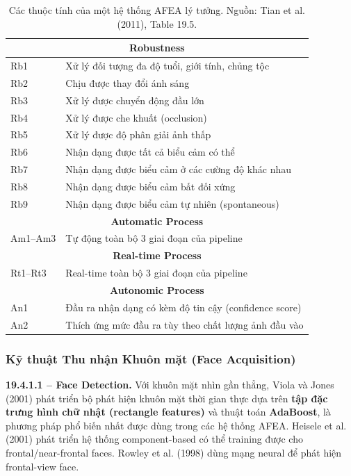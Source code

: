 \documentclass[12pt,a4paper]{article}
\let\oldtextbf\textbf
\renewcommand{\textbf}[1]{\oldtextbf{\textcolor{hcmublue}{#1}}}
\begin{document}
\begin{table}[H]
\centering
\small
\begin{tabular}{|l|l|}
\hline
\multicolumn{2}{|c|}{\textbf{Robustness}} \\ \hline
Rb1 & Xử lý đối tượng đa độ tuổi, giới tính, chủng tộc \\ \hline
Rb2 & Chịu được thay đổi ánh sáng \\ \hline
Rb3 & Xử lý được chuyển động đầu lớn \\ \hline
Rb4 & Xử lý được che khuất (occlusion) \\ \hline
Rb5 & Xử lý được độ phân giải ảnh thấp \\ \hline
Rb6 & Nhận dạng được tất cả biểu cảm có thể \\ \hline
Rb7 & Nhận dạng được biểu cảm ở các cường độ khác nhau \\ \hline
Rb8 & Nhận dạng được biểu cảm bất đối xứng \\ \hline
Rb9 & Nhận dạng được biểu cảm tự nhiên (spontaneous) \\ \hline
\multicolumn{2}{|c|}{\textbf{Automatic Process}} \\ \hline
Am1--Am3 & Tự động toàn bộ 3 giai đoạn của pipeline \\ \hline
\multicolumn{2}{|c|}{\textbf{Real-time Process}} \\ \hline
Rt1--Rt3 & Real-time toàn bộ 3 giai đoạn của pipeline \\ \hline
\multicolumn{2}{|c|}{\textbf{Autonomic Process}} \\ \hline
An1 & Đầu ra nhận dạng có kèm độ tin cậy (confidence score) \\ \hline
An2 & Thích ứng mức đầu ra tùy theo chất lượng ảnh đầu vào \\ \hline
\end{tabular}
\caption{Các thuộc tính của một hệ thống AFEA lý tưởng. Nguồn: Tian et al. (2011), Table 19.5.}
\label{tab:ideal_afea}
\end{table}

\subsubsection{Kỹ thuật Thu nhận Khuôn mặt (Face Acquisition)}

\textbf{19.4.1.1 -- Face Detection.}
Với khuôn mặt nhìn gần thẳng, Viola và Jones (2001) phát triển bộ phát hiện khuôn mặt thời gian thực dựa trên \textbf{tập đặc trưng hình chữ nhật (rectangle features)} và thuật toán \textbf{AdaBoost}, là phương pháp phổ biến nhất được dùng trong các hệ thống AFEA. Heisele et al. (2001) phát triển hệ thống component-based có thể training được cho frontal/near-frontal faces. Rowley et al. (1998) dùng mạng neural để phát hiện frontal-view face.
\end{document}
